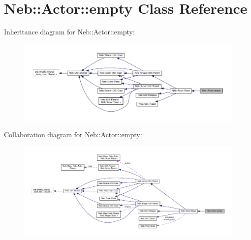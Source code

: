\hypertarget{classNeb_1_1Actor_1_1empty}{\section{Neb\-:\-:Actor\-:\-:empty Class Reference}
\label{classNeb_1_1Actor_1_1empty}
}


Inheritance diagram for Neb\-:\-:Actor\-:\-:empty\-:
\nopagebreak
\begin{figure}[H]
\begin{center}
\leavevmode
\includegraphics[width=350pt]{classNeb_1_1Actor_1_1empty__inherit__graph}
\end{center}
\end{figure}


Collaboration diagram for Neb\-:\-:Actor\-:\-:empty\-:
\nopagebreak
\begin{figure}[H]
\begin{center}
\leavevmode
\includegraphics[width=350pt]{classNeb_1_1Actor_1_1empty__coll__graph}
\end{center}
\end{figure}
